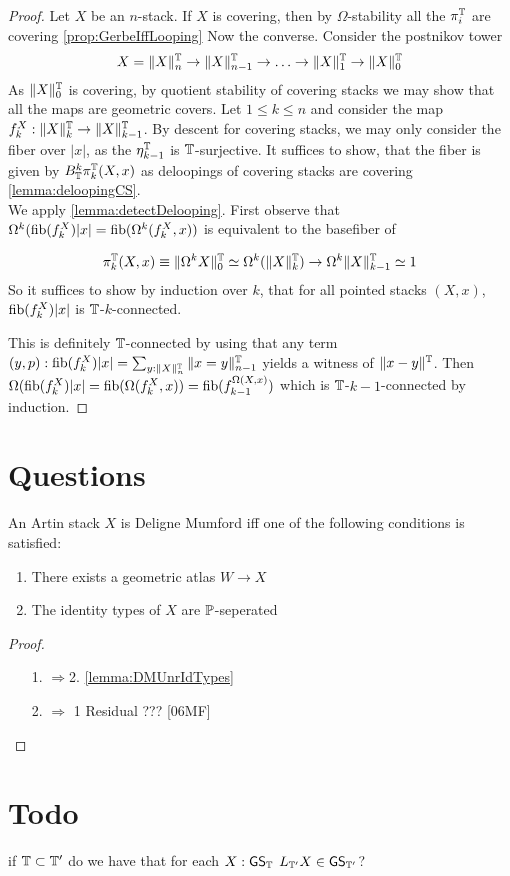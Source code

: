 \documentclass{article}
\renewcommand{\GS}{\mathsf{GS}}
\begin{document}
\begin{proof}
	Let $X$ be an $n$-stack.
	If $X$ is covering, then by $\Omega$-stability all the $\pi_i^{\mathbb{T}}$ are covering \ref{prop:GerbeIffLooping} Now the converse.
	Consider the postnikov tower
	\[
	X = \|X\|_n^{\mathbb{T}} \to \|X\|_{n-1}^{\mathbb{T}} \to \hdots \to \|X\|_1^{\mathbb{T}} \to \|X\|_0^{\mathbb{T}} 
	\]
	As $\|X\|_0^{\mathbb{T}}$ is covering, by quotient stability of covering stacks we may show that all the maps are geometric covers. 
	Let $1 \le k \le n$ and consider the map $f_k^X : \|X\|_{k}^{\mathbb{T}} \to \|X\|_{k-1}^{\mathbb{T}}$. By descent for covering stacks, we may only consider the fiber over $|x|$, as the $\eta_{k-1}^{\mathbb{T}}$ is $\mathbb{T}$-surjective. 
	It suffices to show, that the fiber is given by $B_{\mathbb{T}}^k \pi^{\mathbb{T}}_k(X,x)$ as deloopings of covering stacks are covering \ref{lemma:deloopingCS}.\\	
	We apply \ref{lemma:detectDelooping}.
	First observe that $\Omega^k (\operatorname{fib}(f_k^X) |x| = \operatorname{fib} (\Omega^k (f_k^X , x))$ is equivalent to the basefiber of
	
	\[
	\pi_k^{\mathbb{T}}(X,x) \equiv \|\Omega^k X \|_0^{\mathbb{T}} \simeq \Omega^k(\|X\|_k^{\mathbb{T}}) \to \Omega^k \|X\|_{k-1}^{\mathbb{T}} \simeq 1
	\]
	So it suffices to show by induction over $k$, that for all pointed stacks $(X,x)$, $\operatorname{fib}(f_k^X) |x|$ is $\mathbb{T}$-$k$-connected.

	This is definitely $\mathbb{T}$-connected by using that any term $(y, p) : \operatorname{fib}(f_k^X) |x| = \sum_{y : \|X\|_n^{\mathbb{T}}} \|x = y\|_{n-1}^{\mathbb{T}}$ yields a witness of $\|x - y\|^{\mathbb{T}}$. Then $\Omega (\operatorname{fib}(f_k^X) |x| = \operatorname{fib} (\Omega (f_k^X , x)) = \operatorname{fib} (f_{k-1}^{\Omega (X , x)})$ which is $\mathbb{T}$-$k-1$-connected by induction.
\end{proof}






\section{Questions}
\begin{theorem}[TODO]
	An Artin stack $X$ is Deligne Mumford iff one of the following conditions is satisfied:
	\begin{enumerate}
		\item There exists a geometric atlas $W \to X$
		\item The identity types of $X$ are $\mathbb{P}$-seperated
	\end{enumerate}
\end{theorem}
\begin{proof}
	\begin{enumerate}
		\item [1. $\Rightarrow $2.] \ref{lemma:DMUnrIdTypes}
		\item [2. $\Rightarrow$ 1] Residual ??? [06MF]
	\end{enumerate}
\end{proof}
\section{Todo}

\begin{question}
	if $\mathbb{T} \subset \mathbb{T}'$ do we have that for each $X : \GS_\bT$ $L_{\bT'} X \in \GS_{\bT'}$?
\end{question}

\begin{question}
	
\end{question}
\end{document}
